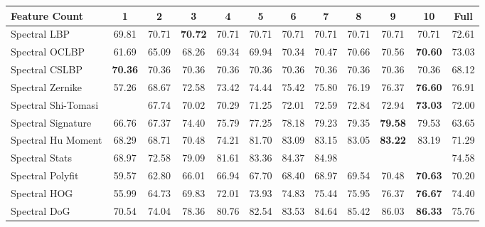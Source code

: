 \documentclass[../thesis.tex]{subfiles}
\begin{document}
    \begin{table}[H]
        \centering
        \addtolength{\tabcolsep}{-4pt}
        \begin{tabular}{l c c c c c c c c c c|c}
            \hline
            \textbf{Feature Count} & \textbf{1} & \textbf{2} & \textbf{3} & \textbf{4} &
            \textbf{5} & \textbf{6} & \textbf{7} & \textbf{8} & \textbf{9} & \textbf{10} & \textbf{Full} \\
            \hline
            Spectral LBP        & 69.81 & 70.71 & \textbf{70.72} & 70.71 & 70.71 & 70.71 & 70.71 & 70.71 & 70.71 & 70.71 & 72.61 \\
            Spectral OCLBP      & 61.69 & 65.09 & 68.26 & 69.34 & 69.94 & 70.34 & 70.47 & 70.66 & 70.56 & \textbf{70.60} & 73.03 \\
            Spectral CSLBP      & \textbf{70.36} & 70.36 & 70.36 & 70.36 & 70.36 & 70.36 & 70.36 & 70.36 & 70.36 & 70.36 & 68.12 \\
            Spectral Zernike    & 57.26 & 68.67 & 72.58 & 73.42 & 74.44 & 75.42 & 75.80 & 76.19 & 76.37 & \textbf{76.60} & 76.91 \\
            \hline
            Spectral Shi-Tomasi & \cellcolor{green!30}{71.11} & 67.74 & 70.02 & 70.29 & 71.25 & 72.01 & 72.59 & 72.84 & 72.94 & \textbf{73.03} & 72.00 \\
            Spectral Signature  & 66.76 & 67.37 & 74.40 & 75.79 & 77.25 & 78.18 & 79.23 & 79.35 & \textbf{79.58} & 79.53 & 63.65 \\
            Spectral Hu Moment  & 68.29 & 68.71 & 70.48 & 74.21 & 81.70 & 83.09 & 83.15 & 83.05 & \textbf{83.22} & 83.19 & 71.29 \\
            Spectral Stats      & 68.97 & 72.58 & 79.09 & 81.61 & 83.36 & 84.37 & 84.98 & \cellcolor{green!30}{85.65} & \cellcolor{green!30}{86.29} & \cellcolor{green!30}{\textbf{86.54}} & 74.58 \\
            Spectral Polyfit    & 59.57 & 62.80 & 66.01 & 66.94 & 67.70 & 68.40 & 68.97 & 69.54 & 70.48 & \textbf{70.63} & 70.20 \\
            \hline
            Spectral HOG        & 55.99 & 64.73 & 69.83 & 72.01 & 73.93 & 74.83 & 75.44 & 75.95 & 76.37 & \textbf{76.67} & 74.40 \\
            Spectral DoG        & 70.54 & 74.04 & 78.36 & 80.76 & 82.54 & 83.53 & 84.64 & 85.42 & 86.03 & \textbf{86.33} & 75.76 \\

\end{tabular}
\end{table}
\end{document}
